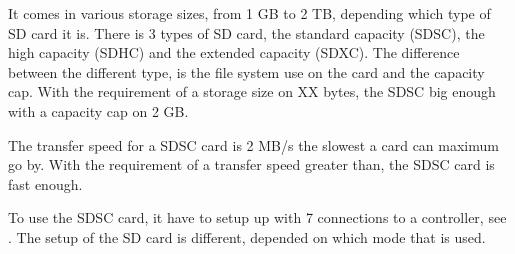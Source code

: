 It comes in various storage sizes, from 1 GB to 2 TB, depending which type of SD card it is. There is 3 types of SD card, the standard capacity (SDSC), the high capacity (SDHC) and the extended capacity (SDXC). The  difference between the different type, is the file system use on the card and the capacity cap. With the requirement of a storage size on XX bytes, the SDSC big enough with a capacity cap on 2 GB. 

The transfer speed for a SDSC card is 2 MB/s the slowest a card can maximum go by. With the requirement of a transfer speed greater than, the SDSC card is fast enough. 

To use the SDSC card, it have to setup up with 7 connections to a controller, see . The setup of the SD card is different, depended on which mode that is used. 

